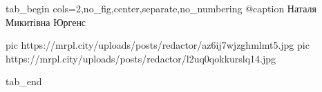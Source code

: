  
 
 
 
 


\ifcmt
  tab_begin cols=2,no_fig,center,separate,no_numbering
	   @caption Наталя Микитівна Юргенс

     pic https://mrpl.city/uploads/posts/redactor/az6ij7wjzghmlmt5.jpg
		 pic https://mrpl.city/uploads/posts/redactor/l2uq0qokkurslq14.jpg

  tab_end
\fi
